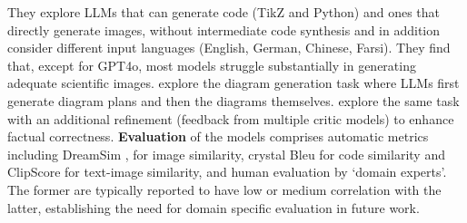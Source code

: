 They explore LLMs that can generate code (TikZ and Python) and ones that directly generate images, without intermediate code synthesis and in addition consider different input languages (English, German, Chinese, Farsi). They find that, except for GPT4o, most models struggle substantially in generating adequate scientific images. %
% 
\citet{Zala2023DiagrammerGPT} %
explore the diagram generation task where LLMs first generate diagram plans and then the diagrams themselves. %
\citet{mondal-etal-2024-scidoc2diagrammer} explore the same task with an additional refinement (feedback from multiple critic models) to enhance factual correctness. 
% 
% 
%
%
%
\textbf{Evaluation} of the models comprises automatic metrics including  DreamSim \citep{10.5555/3666122.3668330}, for image similarity, crystal Bleu \citep{10.1145/3551349.3556903} for code similarity and ClipScore \citep{hessel-etal-2021-clipscore} for text-image similarity, and human evaluation by `domain experts'. The former are typically reported to have low or medium correlation with the latter, establishing the need for domain specific evaluation in future work. 



